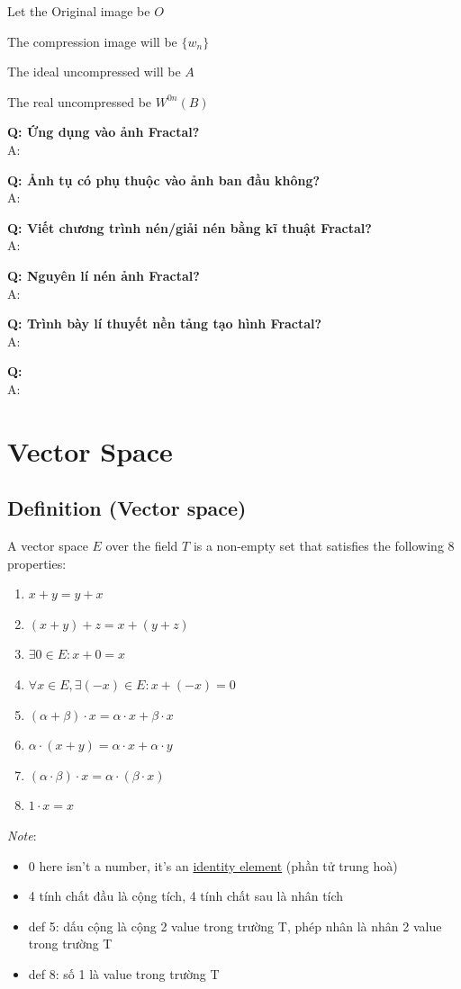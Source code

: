 Let the Original image be $O$

The compression image will be $\{ w_n \}$

The ideal uncompressed will be $A$

The real uncompressed be $W^{0n}(B)$

\textbf{Q: Ứng dụng vào ảnh Fractal?}\\
A: 

\textbf{Q: Ảnh tụ có phụ thuộc vào ảnh ban đầu không?}\\
A:

\textbf{Q: Viết chương trình nén/giải nén bằng kĩ thuật Fractal?}\\
A: 

\textbf{Q: Nguyên lí nén ảnh Fractal?}\\
A: 


\textbf{Q: Trình bày lí thuyết nền tảng tạo hình Fractal?}\\
A: 


\textbf{Q: }\\
A: 

\newpage
\section{Vector Space}
\subsection{Definition (Vector space)}

A vector space $E$ over the field $T$ is a non-empty set that satisfies the following 8 properties:

\begin{enumerate}
    \item $x + y = y + x$
    \item $(x + y) + z = x + (y + z)$
    \item $\exists 0 \in E: x + 0 = x$
    \item $\forall x \in E, \exists (-x) \in E: x + (-x) = 0$
    \item $(\alpha + \beta) \cdot x = \alpha \cdot x + \beta \cdot x$
    \item $\alpha \cdot (x + y) = \alpha \cdot x + \alpha \cdot y$
    \item $(\alpha \cdot \beta) \cdot x = \alpha \cdot (\beta \cdot x)$
    \item $1 \cdot x = x$
\end{enumerate}
\textit{Note}: 
\begin{itemize}
    \item 0 here isn't a number, it's an \href{https://en.wikipedia.org/wiki/Identity_element}{identity element} (phần tử trung hoà)
    \item 4 tính chất đầu là cộng tích, 4 tính chất sau là nhân tích
    \item def 5: dấu cộng là cộng 2 value trong trường T, phép nhân là nhân 2 value trong trường T
    \item def 8: số 1 là value trong trường T
\end{itemize}

